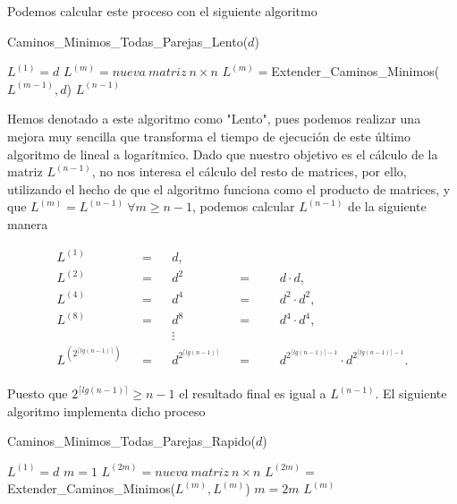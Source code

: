 Podemos calcular este proceso con el siguiente algoritmo

\begin{breakablealgorithm}
	\caption{Caminos\_Minimos\_Todas\_Parejas\_Lento($d$)}
	\begin{algorithmic}[1]
		\State $L^{(1)}=d$
			\State $L^{(m)}=nueva\ matriz\ n\times n$
			\State $L^{(m)}=$Extender\_Caminos\_Minimos($L^{(m-1)},d$)
		\EndFor
		\Return $L^{(n-1)}$
	\end{algorithmic}
\end{breakablealgorithm}

Hemos denotado a este algoritmo como "Lento", pues podemos realizar una mejora muy sencilla que transforma el tiempo de ejecución de este último algoritmo de lineal a logarítmico. Dado que nuestro objetivo es el cálculo de la matriz $L^{(n-1)}$, no nos interesa el cálculo del resto de matrices, por ello, utilizando el hecho de que el algoritmo funciona como el producto de matrices, y que $L^{(m)}=L^{(n-1)}\ \forall m\geq n-1$, podemos calcular $L^{(n-1)}$ de la siguiente manera

\begin{adjustwidth}{5cm}{10cm}
	\begin{align*}
		L^{(1)} &&=&&  d, \\
		L^{(2)} &&=&&   d^2 &&=&& & d\cdot d,\\
		L^{(4)} &&=&&   d^4 &&=&&  &d^2\cdot d^2,\\
		L^{(8)} &&=&&   d^8 &&=&&  &d^4\cdot d^4,\\
		&&&& \vdots \\
		L^{(2^{\lceil lg(n-1)\rceil })} &&=&& d^{2^{\lceil lg(n-1)\rceil }} &&=&&  &d^{2^{\lceil lg(n-1)\rceil -1}}\cdot d^{2^{\lceil lg(n-1)\rceil -1}}.\\
	\end{align*}
\end{adjustwidth}

Puesto que $2^{\lceil lg(n-1)\rceil}\geq n-1$ el resultado final es igual a $L^{(n-1)}$. El siguiente algoritmo implementa dicho proceso

\begin{breakablealgorithm}
	\caption{Caminos\_Minimos\_Todas\_Parejas\_Rapido($d$)}
	\begin{algorithmic}[1]
		\State $L^{(1)}=d$
		\State $m=1$
			\State $L^{(2m)}=nueva\ matriz\ n\times n$
			\State $L^{(2m)}=$Extender\_Caminos\_Minimos($L^{(m)},L^{(m)}$)
			\State $m=2m$
		\EndWhile
		\Return $L^{(m)}$
	\end{algorithmic}
\end{breakablealgorithm}

